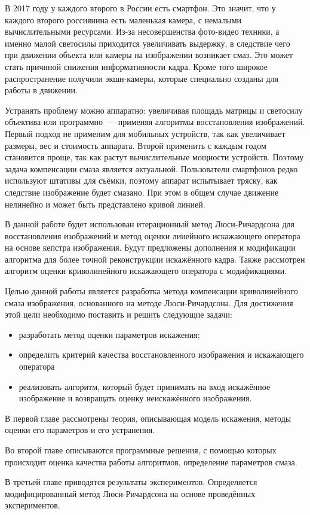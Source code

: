 \intro
В 2017 году у каждого второго в России есть смартфон\cite{mobileUsers}. 
Это значит, что у каждого второго россиянина есть маленькая камера, с немалыми вычислительными ресурсами. Из-за несовершенства фото-видео техники, а именно малой светосилы приходится увеличивать выдержку, в следствие чего при движении объекта или камеры на изображении возникает смаз. Это может стать причиной снижения информативности кадра. Кроме того широкое распространение получили экшн-камеры, которые специально созданы для работы в движении.

Устранять проблему можно аппаратно: увеличивая площадь матрицы и светосилу объектива или программно~--- применяя алгоритмы восстановления изображений. Первый подход не применим для мобильных устройств, так как увеличивает размеры, вес и стоимость аппарата. Второй применить с каждым годом становится проще, так как растут вычислительные мощности устройств. Поэтому задача компенсации смаза является актуальной.
Пользователи смартфонов редко используют штативы для съёмки, поэтому аппарат испытывает тряску, как следствие изображение будет смазано. При этом в общем случае движение нелинейно и может быть представлено кривой линией.

В данной работе будет использован итерационный метод Люси-Ричардсона для восстановления изображений и метод оценки линейного искажающего оператора на основе кепстра изображения. Будут предложены дополнения и модификации алгоритма для более точной реконструкции искажённого кадра. Также рассмотрен алгоритм оценки криволинейного искажающего оператора с модификациями.

Целью данной работы является разработка метода компенсации криволинейного смаза изображения, основанного на методе Люси-Ричардсона. Для достижения этой
цели необходимо поставить и решить следующие задачи:

\begin{itemize}
\item разработать метод оценки параметров искажения;
\item определить критерий качества восстановленного изображения и искажающего оператора
\item реализовать алгоритм, который будет принимать на вход искажённое изображение и возвращать оценку неискажённого изображения.
\end{itemize}

В первой главе рассмотрены теория, описывающая модель искажения, методы оценки его параметров и его устранения.

Во второй главе описываются программные решения, с помощью которых происходит оценка качества работы алгоритмов, определение параметров смаза.

В третьей главе приводятся результаты экспериментов. Определяется модифицированный метод Люси-Ричардсона на основе проведённых экспериментов.
